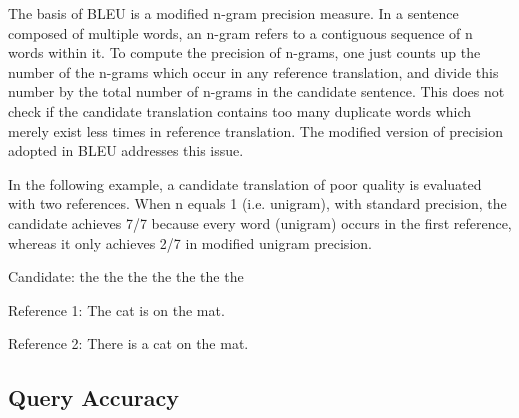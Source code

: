 The basis of BLEU is a modified n-gram precision measure. In a sentence composed of multiple words, an n-gram refers to a contiguous sequence of n words within it. To compute the precision of n-grams, one just counts up the number of the n-grams which occur in any reference translation, and divide this number by the total number of n-grams in the candidate sentence. This does not check if the candidate translation contains too many duplicate words which merely exist less times in reference translation. The modified version of precision adopted in BLEU addresses this issue. 

In the following example, a candidate translation of poor quality is evaluated with two references. When n equals 1 (i.e. unigram), with standard precision, the candidate achieves 7/7 because every word (unigram) occurs in the first reference, whereas it only achieves 2/7 in modified unigram precision. 

Candidate: the the the the the the the

Reference 1: The cat is on the mat.

Reference 2: There is a cat on the mat.



\subsection{Query Accuracy}


